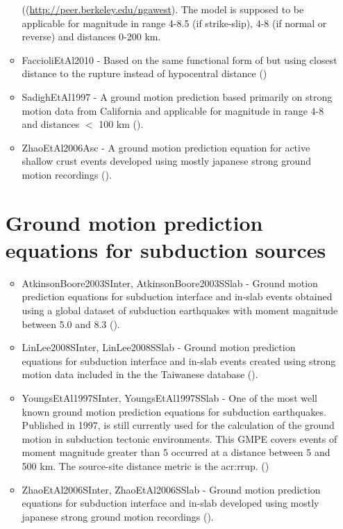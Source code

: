 \begin{itemize}
\begin{itemize}
        ((\href{http://peer.berkeley.edu/ngawest/}{http://peer.berkeley.edu/ngawest}).
        The model is supposed to be applicable for magnitude in range 4-8.5 (if strike-slip),
        4-8 (if normal or reverse) and distances 0-200 km.
    \item FaccioliEtAl2010 - Based on the same functional form of \cite{cauzzi2008} but using
         closest distance to the rupture instead of hypocentral distance (\cite{faccioli2010})
    \item SadighEtAl1997 - A ground motion prediction based primarily on strong motion data 
        from California and applicable for magnitude in range 4-8 and distances $<$ 100 km (\cite{sadigh1997}).
    \item ZhaoEtAl2006Asc - A ground motion prediction equation 
        for active shallow crust events developed using mostly japanese strong ground motion 
        recordings (\cite{zhao2006}).
\end{itemize}
%
\section{Ground motion prediction equations for subduction sources}
\begin{itemize}
    \item AtkinsonBoore2003SInter, AtkinsonBoore2003SSlab - Ground motion prediction equations for 
        subduction interface and in-slab events obtained using a global 
        dataset of subduction earthquakes with moment magnitude between 
        5.0 and 8.3 (\cite{atkinson2003}).
    \item LinLee2008SInter, LinLee2008SSlab - Ground motion prediction equations for subduction
        interface and in-slab events created using strong motion
        data included in the the Taiwanese database (\cite{lin2008}).
    \item YoungsEtAl1997SInter, YoungsEtAl1997SSlab - One of the most well known ground motion 
        prediction equations for subduction earthquakes. Published in 1997,
        is still currently used for the calculation of the ground motion 
        in subduction tectonic environments. This GMPE covers events of 
        moment magnitude greater than 5 occurred at a distance between 5
        and 500 km. The source-site distance metric is the \gls{acr:rrup}. (\cite{youngs1997})
    \item ZhaoEtAl2006SInter, ZhaoEtAl2006SSlab - Ground motion prediction equations 
        for subduction interface and in-slab developed using mostly japanese strong ground motion 
        recordings (\cite{zhao2006}).
\end{itemize}
%

\end{itemize}
